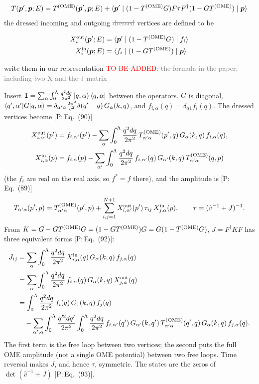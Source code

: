 \documentclass[11pt]{article}
\newcommand{\todo}{\textcolor{red}{TO BE ADDED}}
\newcommand{\tagP}[1]{\textcolor{blue!65!black}{\textsf{\small[P:\,#1]}}}
\newcommand{\aifix}[2]{\textcolor{gray}{\sout{#1}} \textcolor{aicolor}{#2}}
\newcommand{\aifix}[2]{#2}
\newenvironment{aiadd}{\par}{\par}
\begin{document}
\[
	T({\bm p}',{\bm p}; E) = T^{\rm (OME)}({\bm p}', {\bm p}; E) + \langle {\bm p}' \mid (1 - T^{\rm (OME)} G)F\tau F^\dagger(1 - GT^{\rm (OME)})\mid {\bm p} \rangle
\]
the dressed incoming and outgoing \aifix{dressed}{} vertices are defined to be

\begin{align}
	X^{\rm out}_i({\bm p}'; E) & = \langle {\bm p}' \mid (1 - T^{\rm (OME)} G)\mid f_i \rangle \\
	X^{\rm in}_i({\bm p}; E)   & = \langle f_i \mid (1 - GT^{\rm (OME)})\mid {\bm p} \rangle
\end{align}

write them in our representation \aifix{\todo: the formula in the paper, including two X and the J matrix}{}

\begin{aiadd}
	Insert $\bm 1=\sum_\alpha\int_0^\Lambda\frac{q^2dq}{2\pi^2}\ket{q,\alpha}\bra{q,\alpha}$ between the operators. $G$ is diagonal, $\braket{q',\alpha'|G|q,\alpha}=\delta_{\alpha'\alpha}\frac{2\pi^2}{q^2}\delta(q'-q)\,G_\alpha(k,q)$, and $f_{i,\alpha}(q)=\delta_{\alpha1}f_i(q)$. The dressed vertices become \tagP{Eq.~(90)}
	\begin{align*}
		X^{\rm out}_{i,\alpha'}(p') & =f_{i,\alpha'}(p')-\sum_\alpha\int_0^\Lambda\frac{q^2dq}{2\pi^2}\,T^{\rm (OME)}_{\alpha'\alpha}(p',q)\,G_\alpha(k,q)\,f_{i,\alpha}(q),    \\
		X^{\rm in}_{i,\alpha}(p)    & =f_{i,\alpha}(p)-\sum_{\alpha'}\int_0^\Lambda\frac{q^2dq}{2\pi^2}\,f_{i,\alpha'}(q)\,G_{\alpha'}(k,q)\,T^{\rm (OME)}_{\alpha'\alpha}(q,p)
	\end{align*}
	(the $f_i$ are real on the real axis, so $f^*=f$ there), and the amplitude is \tagP{Eq.~(89)}
	\[
		T_{\alpha'\alpha}(p',p)=T^{\rm (OME)}_{\alpha'\alpha}(p',p)+\sum_{i,j=1}^{N+1}X^{\rm out}_{i,\alpha'}(p')\,\tau_{ij}\,X^{\rm in}_{j,\alpha}(p),\qquad\tau=(\hat v^{-1}+J)^{-1}.
	\]
	From $K=G-GT^{\rm (OME)} G=(1-GT^{\rm (OME)})G=G(1-T^{\rm (OME)} G)$, $J=F^\dagger KF$ has three equivalent forms \tagP{Eq.~(92)}:
	\begin{align*}
		J_{ij} & =\sum_\alpha\int_0^\Lambda\frac{q^2dq}{2\pi^2}\,X^{\rm in}_{i,\alpha}(q)\,G_\alpha(k,q)\,f_{j,\alpha}(q)                                                                                              \\
		       & =\sum_\alpha\int_0^\Lambda\frac{q^2dq}{2\pi^2}\,f_{i,\alpha}(q)\,G_\alpha(k,q)\,X^{\rm out}_{j,\alpha}(q)                                                                                             \\
		       & =\int_0^\Lambda\frac{q^2dq}{2\pi^2}\,f_i(q)\,G_1(k,q)\,f_j(q)                                                                                                                                         \\
		       & \quad-\sum_{\alpha',\alpha}\int_0^\Lambda\frac{q'^2dq'}{2\pi^2}\int_0^\Lambda\frac{q^2dq}{2\pi^2}\,f_{i,\alpha'}(q')\,G_{\alpha'}(k,q')\,T^{\rm (OME)}_{\alpha'\alpha}(q',q)\,G_\alpha(k,q)\,f_{j,\alpha}(q).
	\end{align*}
	The first term is the free loop between two vertices; the second puts the full OME amplitude (not a single OME potential) between two free loops. Time reversal makes $J$, and hence $\tau$, symmetric. The states are the zeros of $\det(\hat v^{-1}+J)$ \tagP{Eq.~(93)}.


\end{aiadd}
\end{document}
